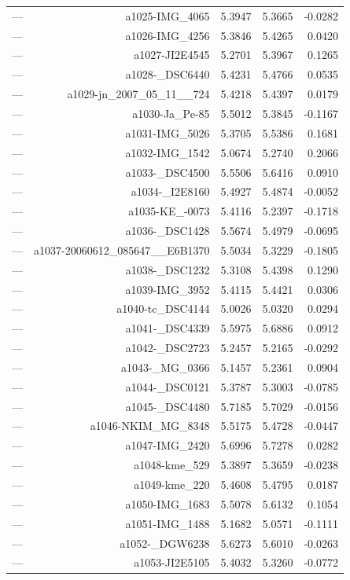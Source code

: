 \begin{table}[htbp]
\begin{tabular}{lrrrr}
— & a1025-IMG_4065 & 5.3947 & 5.3665 & -0.0282 \\
— & a1026-IMG_4256 & 5.3846 & 5.4265 & 0.0420 \\
— & a1027-JI2E4545 & 5.2701 & 5.3967 & 0.1265 \\
— & a1028-_DSC6440 & 5.4231 & 5.4766 & 0.0535 \\
— & a1029-jn_2007_05_11__724 & 5.4218 & 5.4397 & 0.0179 \\
— & a1030-Ja_Pe-85 & 5.5012 & 5.3845 & -0.1167 \\
— & a1031-IMG_5026 & 5.3705 & 5.5386 & 0.1681 \\
— & a1032-IMG_1542 & 5.0674 & 5.2740 & 0.2066 \\
— & a1033-_DSC4500 & 5.5506 & 5.6416 & 0.0910 \\
— & a1034-_I2E8160 & 5.4927 & 5.4874 & -0.0052 \\
— & a1035-KE_-0073 & 5.4116 & 5.2397 & -0.1718 \\
— & a1036-_DSC1428 & 5.5674 & 5.4979 & -0.0695 \\
— & a1037-20060612_085647__E6B1370 & 5.5034 & 5.3229 & -0.1805 \\
— & a1038-_DSC1232 & 5.3108 & 5.4398 & 0.1290 \\
— & a1039-IMG_3952 & 5.4115 & 5.4421 & 0.0306 \\
— & a1040-tc_DSC4144 & 5.0026 & 5.0320 & 0.0294 \\
— & a1041-_DSC4339 & 5.5975 & 5.6886 & 0.0912 \\
— & a1042-_DSC2723 & 5.2457 & 5.2165 & -0.0292 \\
— & a1043-_MG_0366 & 5.1457 & 5.2361 & 0.0904 \\
— & a1044-_DSC0121 & 5.3787 & 5.3003 & -0.0785 \\
— & a1045-_DSC4480 & 5.7185 & 5.7029 & -0.0156 \\
— & a1046-NKIM_MG_8348 & 5.5175 & 5.4728 & -0.0447 \\
— & a1047-IMG_2420 & 5.6996 & 5.7278 & 0.0282 \\
— & a1048-kme_529 & 5.3897 & 5.3659 & -0.0238 \\
— & a1049-kme_220 & 5.4608 & 5.4795 & 0.0187 \\
— & a1050-IMG_1683 & 5.5078 & 5.6132 & 0.1054 \\
— & a1051-IMG_1488 & 5.1682 & 5.0571 & -0.1111 \\
— & a1052-_DGW6238 & 5.6273 & 5.6010 & -0.0263 \\
— & a1053-JI2E5105 & 5.4032 & 5.3260 & -0.0772 \\

\end{tabular}
\end{table}
